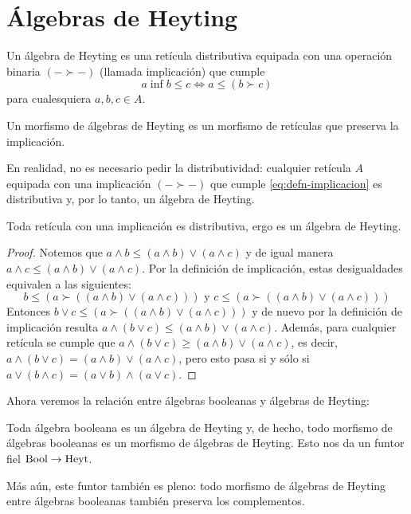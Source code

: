 \section{Álgebras de Heyting}
\label{ss:heyting}

\begin{definition}\label{defn:heyting}
  Un álgebra de Heyting es una retícula distributiva equipada con una
  operación binaria $(-\succ-)$ (llamada implicación) que cumple
  \begin{equation}\label{eq:defn-implicacion}
    a \inf b \leq c \iff a \leq (b\succ c)
  \end{equation}
  para cualesquiera $a,b,c\in A$.

  Un morfismo de álgebras de Heyting es un morfismo de retículas
  que preserva la implicación.
\end{definition}

En realidad, no es necesario pedir la distributividad: cualquier
retícula $A$ equipada con una implicación $(-\succ-)$ que cumple
\eqref{eq:defn-implicacion} es distributiva y, por lo tanto, un
álgebra de Heyting.
\begin{proposition}\label{disheyt}
Toda ret\'icula con una implicación es distributiva, ergo es un álgebra de Heyting.
\end{proposition}
\begin{proof}
    Notemos que $a\wedge b \leq (a\wedge b)\vee (a\wedge c)$ y de
    igual manera $a\wedge c\leq  (a\wedge b)\vee (a\wedge c)$. Por la
    definición de implicación, estas desigualdades equivalen a las
    siguientes:
    \[b\leq (a \succ ((a \wedge b) \vee (a \wedge c))) \mbox{ y } c
    \leq (a\succ ((a \wedge b) \vee (a \wedge c)))\]
    Entonces $b \vee c \leq (a \succ ((a \wedge b) \vee (a \wedge
    c)))$ y de nuevo por la definición de implicación resulta $a
    \wedge (b \vee c)\leq (a\wedge b)\vee (a \wedge c)$. Además, para
    cualquier retícula se cumple que $a \wedge (b \vee c)\geq (a\wedge
    b)\vee (a \wedge c)$, es decir, $a \wedge (b \vee c)= (a\wedge
    b)\vee (a \wedge c)$, pero esto pasa si y sólo si $a \vee (b
    \wedge c)= (a\vee b)\wedge (a \vee c)$.
\end{proof}

Ahora veremos la relación entre álgebras booleanas y álgebras de
Heyting:
\begin{lemma}
  Toda álgebra booleana es un álgebra de Heyting y, de hecho,
  todo morfismo de álgebras booleanas es un morfismo de álgebras de
  Heyting. Esto nos da un funtor fiel $\mathrm{Bool}\to\mathrm{Heyt}$.

  Más aún, este funtor también es pleno: todo morfismo de álgebras de
  Heyting entre álgebras booleanas también preserva los complementos.
\end{lemma}

